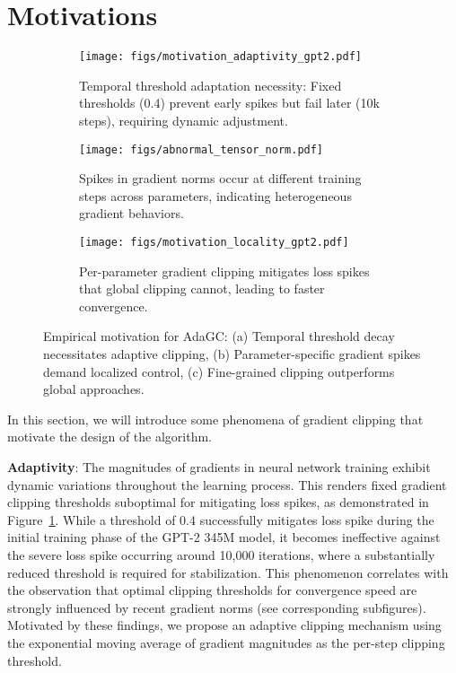\section{Motivations}
\label{sec:motivations}
\begin{figure}[!t]
    \vskip 0.1in
    \centering
    \begin{subfigure}{\columnwidth}
        \centering
        \texttt{[image: figs/motivation\_adaptivity\_gpt2.pdf]}
        \vspace{-6mm}
        \caption{Temporal threshold adaptation necessity: Fixed thresholds (0.4) prevent early spikes but fail later (10k steps), requiring dynamic adjustment.}
        \label{fig:motivation_adaptivity}
    \end{subfigure}
    \begin{subfigure}{\columnwidth}
        \centering
        \texttt{[image: figs/abnormal\_tensor\_norm.pdf]}
        \vspace{-6mm}
        \caption{Spikes in gradient norms occur at different training steps across parameters, indicating heterogeneous gradient behaviors.}
        \label{fig:abnormal_tensor_norm}
    \end{subfigure}
    \begin{subfigure}{\columnwidth}
        \centering
        \texttt{[image: figs/motivation\_locality\_gpt2.pdf]}
        \vspace{-6mm}
        \caption{Per-parameter gradient clipping mitigates loss spikes that global clipping cannot, leading to faster convergence.}
        \label{fig:motivation_locality}
    \end{subfigure}
    \caption{Empirical motivation for AdaGC: (a) Temporal threshold decay necessitates adaptive clipping, (b) Parameter-specific gradient spikes demand localized control, (c) Fine-grained clipping outperforms global approaches.}
    \label{fig:motivation}
    \vskip -0.2in
\end{figure}

In this section, we will introduce some phenomena of gradient clipping that motivate the design of the algorithm. 


{\bf Adaptivity}: The magnitudes of gradients in neural network training exhibit dynamic variations throughout the learning process. This renders fixed gradient clipping thresholds suboptimal for mitigating loss spikes, as demonstrated in Figure~\ref{fig:motivation_adaptivity}. While a threshold of 0.4 successfully mitigates loss spike during the initial training phase of the GPT-2 345M model, it becomes ineffective against the severe loss spike occurring around 10,000 iterations, where a substantially reduced threshold is required for stabilization. This phenomenon correlates with the observation that optimal clipping thresholds for convergence speed are strongly influenced by recent gradient norms (see corresponding subfigures). Motivated by these findings, we propose an adaptive clipping mechanism using the exponential moving average of gradient magnitudes as the per-step clipping threshold.
 
